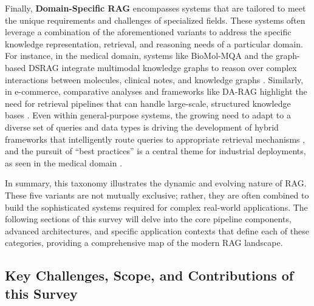 \documentclass[11pt]{article}
\begin{document}
Finally, \textbf{Domain-Specific RAG} encompasses systems that are tailored to meet the unique requirements and challenges of specialized fields. These systems often leverage a combination of the aforementioned variants to address the specific knowledge representation, retrieval, and reasoning needs of a particular domain. For instance, in the medical domain, systems like BioMol-MQA and the graph-based DSRAG integrate multimodal knowledge graphs to reason over complex interactions between molecules, clinical notes, and knowledge graphs \cite{ref55,ref56}. Similarly, in e-commerce, comparative analyses and frameworks like DA-RAG highlight the need for retrieval pipelines that can handle large-scale, structured knowledge bases \cite{ref57,ref39}. Even within general-purpose systems, the growing need to adapt to a diverse set of queries and data types is driving the development of hybrid frameworks that intelligently route queries to appropriate retrieval mechanisms \cite{ref58}, and the pursuit of ``best practices'' is a central theme for industrial deployments, as seen in the medical domain \cite{ref59}.

In summary, this taxonomy illustrates the dynamic and evolving nature of RAG. These five variants are not mutually exclusive; rather, they are often combined to build the sophisticated systems required for complex real-world applications. The following sections of this survey will delve into the core pipeline components, advanced architectures, and specific application contexts that define each of these categories, providing a comprehensive map of the modern RAG landscape.

\subsection{Key Challenges, Scope, and Contributions of this Survey}
\end{document}
